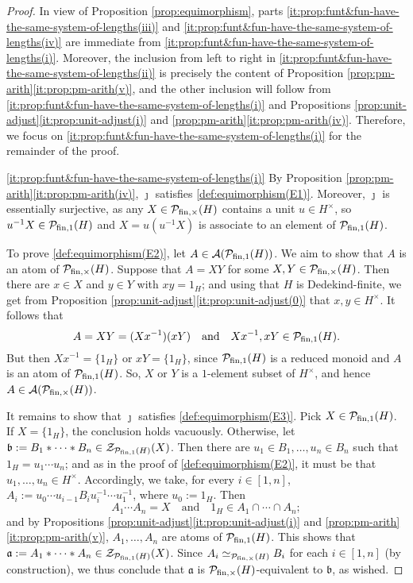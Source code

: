 \begin{proof}
	In view of Proposition \ref{prop:equimorphism}, parts \ref{it:prop:funt&fun-have-the-same-system-of-lengths(iii)} and \ref{it:prop:funt&fun-have-the-same-system-of-lengths(iv)} are immediate from \ref{it:prop:funt&fun-have-the-same-system-of-lengths(i)}.
	Moreover, the inclusion from left to right in \ref{it:prop:funt&fun-have-the-same-system-of-lengths(ii)} is precisely the content of Proposition \ref{prop:pm-arith}\ref{it:prop:pm-arith(v)}, and the other inclusion will follow from \ref{it:prop:funt&fun-have-the-same-system-of-lengths(i)} and Propositions \ref{prop:unit-adjust}\ref{it:prop:unit-adjust(i)} and \ref{prop:pm-arith}\ref{it:prop:pm-arith(iv)}.
	Therefore, we focus on \ref{it:prop:funt&fun-have-the-same-system-of-lengths(i)} for the remainder of the proof.
	
	\ref{it:prop:funt&fun-have-the-same-system-of-lengths(i)} By Proposition \ref{prop:pm-arith}\ref{it:prop:pm-arith(iv)}, $\jmath$ satisfies \ref{def:equimorphism(E1)}.
	Moreover, $\jmath$ is essentially surjective, as any $X\in \mathcal P_{\textrm{fin}, \times}(H)$ contains a unit $u \in H^\times$, so $u^{-1}X\in \mathcal P_{\textrm{fin}, 1}(H)$ and $X = u(u^{-1}X)$ is associate to an element of $\mathcal P_{\textrm{fin}, 1}(H)$. 

	To prove \ref{def:equimorphism(E2)}, let $A\in\mathcal{A}(\mathcal P_{\textrm{fin}, 1}(H))$.
	We aim to show that $A$ is an atom of $\mathcal P_{\textrm{fin}, \times}(H)$. Suppose that $A = XY$ for some $X,Y\in \mathcal P_{\textrm{fin}, \times}(H)$. Then there are $x \in X$ and $y \in Y$ with
	$xy=1_H$; and using that $H$ is Dedekind-finite, we get from Proposition \ref{prop:unit-adjust}\ref{it:prop:unit-adjust(0)} that $x,y\in H^\times$.
	It follows that 
	\[
	A = XY = (Xx^{-1})(xY)
	\quad\text{and}\quad
	Xx^{-1}, xY\in \mathcal P_{\textrm{fin}, 1}(H). 
	\]
	But then
	$Xx^{-1} = \{1_H\}$ or $xY = \{1_H\}$, since $\mathcal P_{\textrm{fin}, 1}(H)$ is a reduced monoid and $A$ is an atom of $\mathcal P_{\textrm{fin}, 1}(H)$.
	So, $X$ or $Y$ is a $1$-element subset of $H^\times$, and hence $A \in \mathcal{A}(\mathcal P_{\textrm{fin}, \times}(H))$. 
	 
	
	It remains to show that $\jmath$ satisfies \ref{def:equimorphism(E3)}.  Pick $X \in \mathcal P_{\textrm{fin}, 1}(H)$. If $X = \{1_H\}$, the conclusion holds vacuously. Otherwise, let $\mathfrak{b} := B_1*\cdots*B_n \in \mathcal Z_{\mathcal P_{\textrm{fin}, 1}(H)}(X)$. Then there are $u_1\in B_1,\ldots, u_n\in B_n$ such that $1_H = u_1\cdots u_n$; and as in the proof of \ref{def:equimorphism(E2)}, it must be that $u_1,\ldots, u_n\in H^\times$.
	Accordingly, we take, for every $i \in [ 1, n ]$, $A_i := u_0 \cdots u_{i-1} B_i u_i^{-1} \cdots u_1^{-1}$, where $u_0 := 1_H$.
	Then 
	\[
	A_1 \cdots A_n = X
	\quad\text{and}\quad
	1_H \in A_1 \cap \cdots \cap A_n;
	\]
	and by Propositions \ref{prop:unit-adjust}\ref{it:prop:unit-adjust(i)} and \ref{prop:pm-arith}\ref{it:prop:pm-arith(v)}, $A_1, \ldots, A_n$ are atoms of $\mathcal P_{{\textrm{fin}, 1}}(H)$. This shows that $\mathfrak{a}:= A_1*\cdots * A_n \in \mathcal{Z}_{\mathcal P_{\textrm{fin}, 1}(H)}(X)$. Since $A_i \simeq_{\mathcal P_{\textrm{fin}, \times}(H)} B_i$ for each $i \in [ 1, n ]$ (by construction), we thus conclude that $\mathfrak{a}$ is $\mathcal P_{{\textrm{fin}, \times}}(H)$-equivalent to $\mathfrak{b}$, as wished.
%	
\end{proof} 
